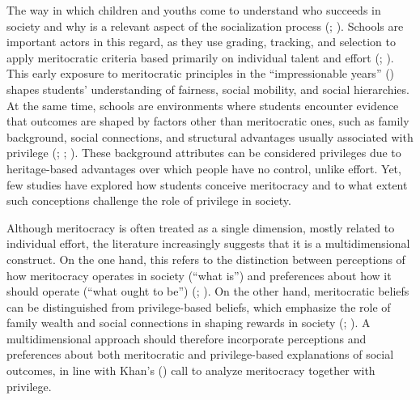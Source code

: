 \documentclass[
  11pt,
]{article}
\begin{document}
The way in which children and youths come to understand who succeeds in
society and why is a relevant aspect of the socialization process
(;
). Schools are
important actors in this regard, as they use grading, tracking, and
selection to apply meritocratic criteria based primarily on individual
talent and effort (; ). This
early exposure to meritocratic principles in the ``impressionable
years'' ()
shapes students' understanding of fairness, social mobility, and social
hierarchies. At the same time, schools are environments where students
encounter evidence that outcomes are shaped by factors other than
meritocratic ones, such as family background, social connections, and
structural advantages usually associated with privilege
(;
;
). These
background attributes can be considered privileges due to heritage-based
advantages over which people have no control, unlike effort. Yet, few
studies have explored how students conceive meritocracy and to what
extent such conceptions challenge the role of privilege in society.

Although meritocracy is often treated as a single dimension, mostly
related to individual effort, the literature increasingly suggests that
it is a multidimensional construct. On the one hand, this refers to the
distinction between perceptions of how meritocracy operates in society
(``what is'') and preferences about how it should operate (``what ought
to be'') (; ). On the other hand, meritocratic beliefs can be distinguished
from privilege-based beliefs, which emphasize the role of family wealth
and social connections in shaping rewards in society
(;
). A
multidimensional approach should therefore incorporate perceptions and
preferences about both meritocratic and privilege-based explanations of
social outcomes, in line with Khan's
() call to analyze meritocracy
together with privilege.
\end{document}
